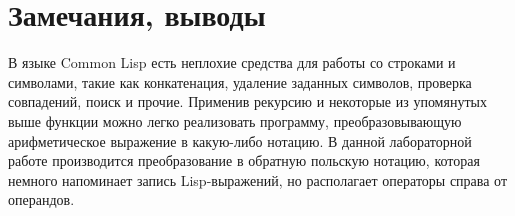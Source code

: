 \documentclass[a4paper, 12pt]{article}
\begin{document}
\section{Замечания, выводы}
В языке Common Lisp есть неплохие средства для работы со строками и символами, такие как конкатенация, удаление заданных символов, проверка совпадений, поиск и прочие. Применив рекурсию и некоторые из упомянутых выше функции можно легко реализовать программу, преобразовывающую арифметическое выражение в какую-либо нотацию. В данной лабораторной работе производится преобразование в обратную польскую нотацию, которая немного напоминает запись Lisp-выражений, но располагает операторы справа от операндов.
\end{document}
